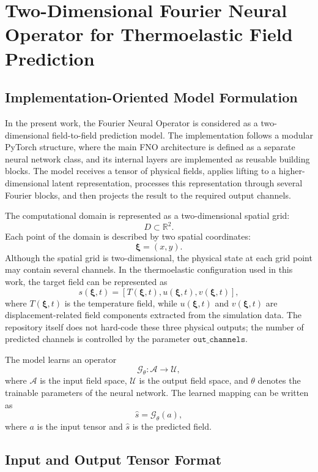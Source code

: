 \documentclass[14pt]{extarticle}
\begin{document}
\section{Two-Dimensional Fourier Neural Operator for Thermoelastic Field Prediction}

\subsection{Implementation-Oriented Model Formulation}

In the present work, the Fourier Neural Operator is considered as a two-dimensional field-to-field prediction model. The implementation follows a modular PyTorch structure, where the main FNO architecture is defined as a separate neural network class, and its internal layers are implemented as reusable building blocks. The model receives a tensor of physical fields, applies lifting to a higher-dimensional latent representation, processes this representation through several Fourier blocks, and then projects the result to the required output channels.

The computational domain is represented as a two-dimensional spatial grid:
\[
D \subset \mathbb{R}^{2}.
\]
Each point of the domain is described by two spatial coordinates:
\[
\boldsymbol{\xi} = (x,y).
\]
Although the spatial grid is two-dimensional, the physical state at each grid point may contain several channels. In the thermoelastic configuration used in this work, the target field can be represented as
\[
s(\boldsymbol{\xi}, t)
=
\left[
T(\boldsymbol{\xi}, t),
u(\boldsymbol{\xi}, t),
v(\boldsymbol{\xi}, t)
\right],
\]
where \(T(\boldsymbol{\xi}, t)\) is the temperature field, while \(u(\boldsymbol{\xi}, t)\) and \(v(\boldsymbol{\xi}, t)\) are displacement-related field components extracted from the simulation data. The repository itself does not hard-code these three physical outputs; the number of predicted channels is controlled by the parameter \(\texttt{out\_channels}\).

The model learns an operator
\[
\mathcal{G}_{\theta}: \mathcal{A} \rightarrow \mathcal{U},
\]
where \(\mathcal{A}\) is the input field space, \(\mathcal{U}\) is the output field space, and \(\theta\) denotes the trainable parameters of the neural network. The learned mapping can be written as
\[
\hat{s}
=
\mathcal{G}_{\theta}(a),
\]
where \(a\) is the input tensor and \(\hat{s}\) is the predicted field.

\subsection{Input and Output Tensor Format}
\end{document}
